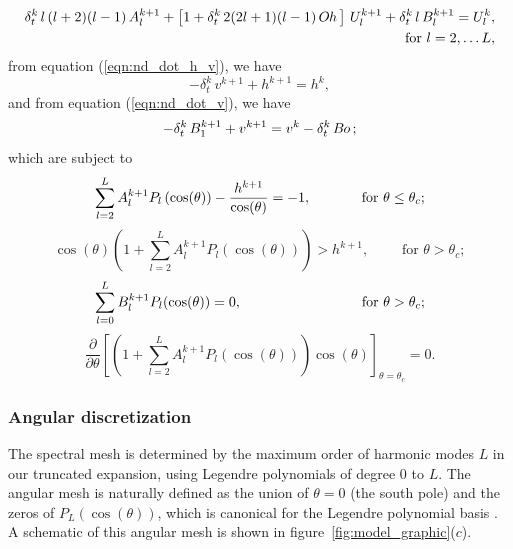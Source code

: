 \documentclass{jfm}
\newcommand{\Bo}{B\kern-0.05em o\,}
\newcommand{\Oh}{O\kern-0.05em h\,}
\begin{document}
\begin{equation}\label{eqn:Euler_mode_speed}
\begin{aligned}
    \delta^k_t \, l \, (l+2)(l-1) \, A^{k+1}_l + \left[1 + \delta^k_t \, 2(2l+1)(l-1) \, \Oh \right] \,{U}_l^{k+1} + \delta^k_t \, l \, B_l^{k+1} =U^k_l,& \\ \text{ for } l = 2, \ldots L,&
\end{aligned}
\end{equation}
from equation (\ref{eqn:nd_dot_h_v}), we have
\begin{equation}
    - \delta_t^k \, v^{k+1} + h^{k+1} = h^{k},
\end{equation}
and from equation 
(\ref{eqn:nd_dot_v}), we have
\begin{equation}\label{eqn:Acc_CM}
    -\delta_t^k \, B_1^{k+1} + v^{k+1} = v^k -  \delta_t^k \, \Bo;
\end{equation}
which are subject to
\begin{equation}\label{eqn:km_contact_amplitudes_finite_modes}
    \sum\limits_{l=2}^{L} {A_l^{k+1}P_l\left(\cos(\theta)\right)} - \frac{h^{k+1}}{\cos(\theta)} = -1,
    \qquad \quad  \hspace{1 mm} \text{ for } \theta \leq \theta_c;
\end{equation}
\begin{equation}\label{eqn:km_non-contact_amplitudes_finite_modes}
    \cos(\theta)\left(1+\sum\limits_{l=2}^{L} {A_l^{k+1}P_l\left(\cos(\theta)\right)}\right) > h^{k+1}, \qquad \text{ for } \theta > \theta_c;
\end{equation}
\begin{equation}\label{eqn:Press_zero}
    \sum\limits_{l=0}^{L} {B_l^{k+1}P_l(\cos(\theta))} = 0, \qquad \hspace{22 mm} \text{ for } \theta > \theta_c;
\end{equation}
\begin{equation}\label{eqn:km_contact_derivative_finite_modes}
    \frac{\partial}{\partial \theta}\left[\left(1+\sum\limits_{l=2}^L {A_l^{k+1}P_l(\cos(\theta))}\right)\cos(\theta)\right]_{\theta=\theta_c} = 0.
\end{equation}

\subsubsection{Angular discretization} \label{subsubsec:angulardiscretisation}

The spectral mesh is determined by the maximum order of harmonic modes $L$ in our truncated expansion, using Legendre polynomials of degree $0$ to $L$. The angular mesh is naturally defined as the union of ${\theta = 0}$ (the south pole) and the zeros of $P_L(\cos(\theta))$, which is canonical for the Legendre polynomial basis \citep{boyd2000chebyshev}. A schematic of this angular mesh is shown in figure~\ref{fig:model_graphic}($c$).
\end{document}
